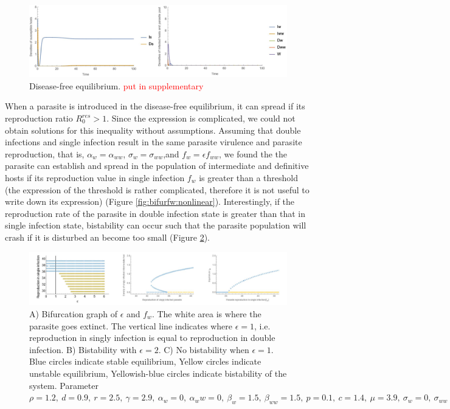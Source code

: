 \documentclass{article}
\begin{document}
\begin{figure}[!ht]
\includegraphics[width=\textwidth]{Figures/diseasefree_nonlinear}
\caption{Disease-free equilibrium. \textcolor{red}{put in supplementary}}
\label{fig:diseasefree:nonlinear}
\end{figure}

When a parasite is introduced in the disease-free equilibrium, it can spread if its reproduction ratio $R_0^{res} > 1$. 
Since the expression is complicated, we could not obtain solutions for this inequality without assumptions. 
Assuming that double infections and single infection result in the same parasite virulence and parasite reproduction, that is, $\alpha_w = \alpha_{ww}$, $\sigma_w = \sigma_{ww}$,and $f_w = \epsilon f_{ww}$, we found the the parasite can establish and spread in the population of intermediate and definitive hosts if its reproduction value in single infection $f_w$ is greater than a threshold (the expression of the threshold is rather complicated, therefore it is not useful to write down its expression) (Figure \ref{fig:bifurfw:nonlinear}). Interestingly, if the reproduction rate of the parasite in double infection state is greater than that in single infection state, bistability can occur such that the parasite population will crash if it is disturbed an become too small (Figure \ref{fig:bistability}). 

\begin{figure}[!ht]
\includegraphics[width = \textwidth]{Figures/bistability.jpg}
\caption{A) Bifurcation graph of $\epsilon$ and $f_w$. The white area is where the parasite goes extinct. The vertical line indicates where $\epsilon = 1$, i.e. reproduction in singly infection is equal to reproduction in double infection. B) Bistability with $\epsilon = 2$. C) No bistability when $\epsilon = 1$. Blue circles indicate stable equilibrium, Yellow circles indicate unstable equilibrium, Yellowish-blue circles indicate bistability of the system. Parameter $\rho = 1.2, \  d = 0.9, \  r = 2.5, \ \gamma = 2.9, \ \alpha_w = 0, \ \alpha_ww =  0, \ \beta_w = 1.5, \ \beta_{ww} = 1.5, \ p = 0.1, \  c = 1.4, \ \mu = 3.9,  \ \sigma_w = 0, \ \sigma_{ww} = 0, \  q = 0.01, \ \delta = 0.9, \ k = 0.26$
}
\label{fig:bistability}
\end{figure}
\end{document}
